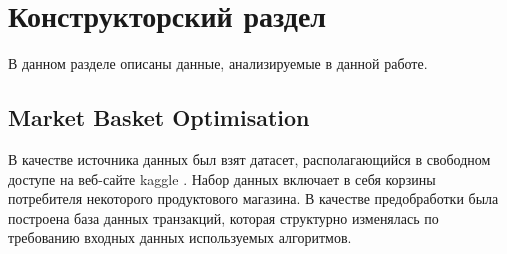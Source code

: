 \section{Конструкторский раздел}

В данном разделе описаны данные, анализируемые в данной работе.

\subsection{Market Basket Optimisation}

В качестве источника данных был взят датасет, располагающийся в свободном доступе на веб-сайте kaggle \cite{dataset}. Набор данных включает в себя корзины потребителя некоторого продуктового магазина. В качестве предобработки была построена база данных транзакций, которая структурно изменялась по требованию входных данных используемых алгоритмов.

\pagebreak